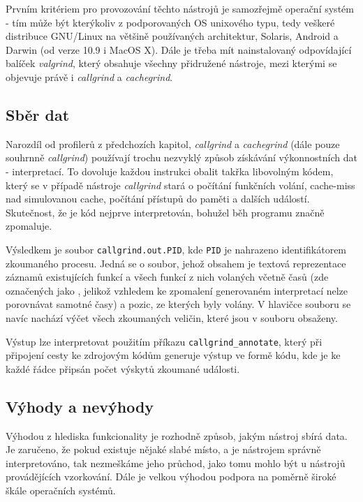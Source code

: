 \documentclass[czech,BP]{thesiskiv}
\begin{document}
Prvním kritériem pro provozování těchto nástrojů je samozřejmě operační systém - tím může být kterýkoliv z podporovaných OS unixového typu, tedy veškeré distribuce GNU/Linux na většině používaných architektur, Solaris, Android a Darwin (od verze 10.9 i MacOS X)\cite{grind1}. Dále je třeba mít nainstalovaný odpovídající balíček \emph{valgrind}, který obsahuje všechny přidružené nástroje, mezi kterými se objevuje právě i \emph{callgrind} a \emph{cachegrind}.

\subsection*{Sběr dat}

Narozdíl od profilerů z předchozích kapitol, \emph{callgrind} a \emph{cachegrind} (dále pouze souhrnně \emph{callgrind}) používají trochu nezvyklý způsob získávání výkonnostních dat - interpretací. To dovoluje každou instrukci obalit takřka libovolným kódem, který se v případě nástroje \emph{callgrind} stará o počítání funkčních volání, cache-miss nad simulovanou cache, počítání přístupů do paměti a dalších událostí. Skutečnost, že je kód nejprve interpretován, bohužel běh programu značně zpomaluje.

Výsledkem je soubor \texttt{callgrind.out.PID}, kde \texttt{PID} je nahrazeno identifikátorem zkoumaného procesu. Jedná se o soubor, jehož obsahem je textová reprezentace záznamů existujících funkcí a všech funkcí z nich volaných včetně časů (zde označených jako , jelikož vzhledem ke zpomalení generovaném interpretací nelze porovnávat samotné časy) a pozic, ze kterých byly volány. V hlavičce souboru se navíc nachází výčet všech zkoumaných veličin, které jsou v souboru obsaženy\cite{grind3}.

Výstup lze interpretovat použitím příkazu \texttt{callgrind\_annotate}, který při připojení cesty ke zdrojovým kódům generuje výstup ve formě kódu, kde je ke každé řádce připsán počet výskytů zkoumané události.

\subsection*{Výhody a nevýhody}

Výhodou z hlediska funkcionality je rozhodně způsob, jakým nástroj sbírá data. Je zaručeno, že pokud existuje nějaké slabé místo, a je nástrojem správně interpretováno, tak nezmeškáme jeho průchod, jako tomu mohlo být u nástrojů provádějících vzorkování. Dále je velkou výhodou podpora na poměrně široké škále operačních systémů.
\end{document}
